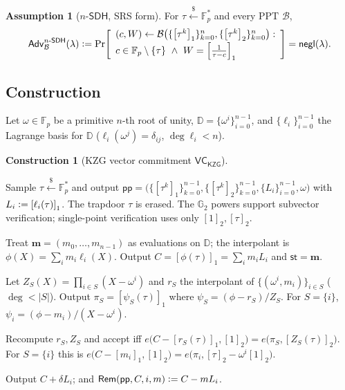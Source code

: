 \documentclass[version=submission]{iacrcc}
\theoremstyle{definition}
\newtheorem{construction}{Construction}[section]
\newtheorem{assumption}{Assumption}[section]
\newcommand{\secpar}{\lambda}
\newcommand{\negl}{\mathsf{negl}}
\newcommand{\PPT}{\mathrm{PPT}}
\newcommand{\sample}{\xleftarrow{\;\$\;}}
\newcommand{\defeq}{\vcentcolon=}
\newcommand{\Setup}{\mathsf{Setup}}
\newcommand{\Commit}{\mathsf{Commit}}
\newcommand{\Open}{\mathsf{Open}}
\newcommand{\Vfy}{\mathsf{Verify}}
\newcommand{\Update}{\mathsf{Update}}
\newcommand{\Rem}{\mathsf{Rem}}
\newcommand{\pp}{\mathsf{pp}}
\newcommand{\aux}{\mathsf{st}}
\newcommand{\Adv}{\mathsf{Adv}}
\newcommand{\B}{\mathcal{B}}
\newcommand{\VC}{\mathsf{VC}}
\newcommand{\GG}{\mathbb{G}}
\newcommand{\FF}{\mathbb{F}}
\newcommand{\gone}[1]{\left[#1\right]_{1}}
\newcommand{\gtwo}[1]{\left[#1\right]_{2}}
\newcommand{\dom}{\mathbb{D}}
\newcommand{\lag}{\ell}
\newcommand{\nsdh}{n\text{-}\mathsf{SDH}}
\newcommand{\Zpol}{Z}
\newcommand{\rpol}{r}
\begin{document}
\begin{assumption}[$\nsdh$, SRS form]\label{ass:nsdh}
For $\tau\sample\FF_p^{*}$ and every $\PPT$ $\B$,
\[
  \Adv^{\nsdh}_{\B}(\secpar)\defeq
  \Pr\!\left[
  \begin{array}{l}
    (c,W)\leftarrow\B\big(\{\gone{\tau^{k}}\}_{k=0}^{n},
                          \{\gtwo{\tau^{k}}\}_{k=0}^{n}\big):\\[2pt]
    c\in\FF_p\setminus\{\tau\}\ \wedge\ W=\gone{\tfrac{1}{\tau-c}}
  \end{array}
  \right]=\negl(\secpar).
\]
\end{assumption}

\subsection{Construction}

Let $\omega\in\FF_p$ be a primitive $n$-th root of unity,
$\dom=\{\omega^{i}\}_{i=0}^{n-1}$, and $\{\lag_i\}_{i=0}^{n-1}$ the Lagrange basis
for $\dom$ ($\lag_i(\omega^{j})=\delta_{ij}$, $\deg\lag_i<n$).

\begin{construction}[KZG vector commitment $\VC_{\mathsf{KZG}}$]\label{con:vc}
\leavevmode
\begin{description}[leftmargin=0em,itemsep=4pt]
\item[$\VC.\Setup(1^\secpar,1^{n})$.] Sample $\tau\sample\FF_p^{*}$ and output
      $\pp=\big(\{\gone{\tau^{k}}\}_{k=0}^{n-1},\{\gtwo{\tau^{k}}\}_{k=0}^{n-1},
      \{L_i\}_{i=0}^{n-1},\omega\big)$ with $L_i\defeq\gone{\lag_i(\tau)}$. The
      trapdoor $\tau$ is erased. The $\GG_2$ powers support subvector
      verification; single-point verification uses only $\gtwo{1},\gtwo{\tau}$.
\item[$\VC.\Commit(\pp,\mathbf{m})$.] Treat $\mathbf{m}=(m_0,\dots,m_{n-1})$ as
      evaluations on $\dom$; the interpolant is $\phi(X)=\sum_i m_i\lag_i(X)$.
      Output $C=\gone{\phi(\tau)}=\sum_{i}m_i L_i$ and $\aux=\mathbf{m}$.
\item[$\VC.\Open(\pp,\aux,S)$.] Let $\Zpol_S(X)=\prod_{i\in S}(X-\omega^{i})$ and
      $\rpol_S$ the interpolant of $\{(\omega^{i},m_i)\}_{i\in S}$ ($\deg<|S|$).
      Output $\pi_S=\gone{\psi_S(\tau)}$ where
      $\psi_S=(\phi-\rpol_S)/\Zpol_S$. For $S=\{i\}$,
      $\psi_i=(\phi-m_i)/(X-\omega^{i})$.
\item[$\VC.\Vfy(\pp,C,S,\{m_i\}_{i\in S},\pi_S)$.] Recompute $\rpol_S,\Zpol_S$ and
      accept iff
      $e\big(C-\gone{\rpol_S(\tau)},\gtwo{1}\big)=e\big(\pi_S,\gtwo{\Zpol_S(\tau)}\big)$.
      For $S=\{i\}$ this is
      $e\big(C-\gone{m_i},\gtwo{1}\big)=e\big(\pi_i,\gtwo{\tau}-\omega^{i}\gtwo{1}\big)$.
\item[$\VC.\Update(\pp,C,i,\delta)$.] Output $C+\delta L_i$; and
      $\Rem(\pp,C,i,m)\defeq C-m L_i$.
\end{description}
\end{construction}
\end{document}
